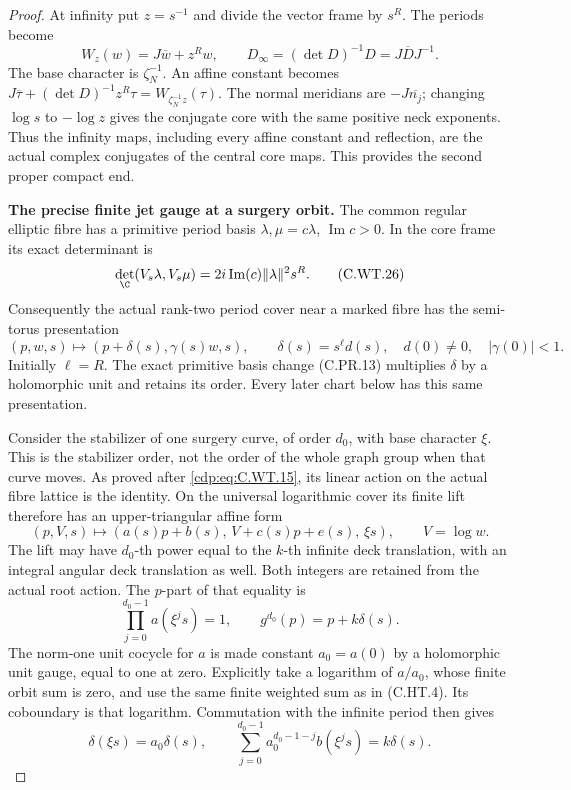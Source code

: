 \begin{proof}
At infinity put \(z=s^{-1}\)
and divide the vector frame
by \(s^R\). The periods become
\[
              W_z(w)=J\overline w+z^Rw,\qquad
              D_{\infty}=(\det D)^{-1}D
                       =J\overline D J^{-1}.
 \tag{C.WT.25}\label{cdp:eq:C.WT.25}
\]
The base character is
\(\zeta_N^{-1}\). An affine
constant becomes
\(J\overline\tau+(\det D)^{-1}z^R\tau
=W_{\zeta_N^{-1}z}(\tau)\).
The normal meridians are
\(-J\overline{n_j}\); changing
\(\log s\) to \(-\log z\)
gives the conjugate core
with the same positive neck
exponents. Thus the infinity
maps, including every affine
constant and reflection, are
the actual complex conjugates
of the central core maps.
This provides the second
proper compact end.

\par\medskip\noindent\textbf{The precise finite jet gauge at a surgery orbit.}
The common regular elliptic fibre has a
primitive period basis \(\lambda,\mu=c\lambda\),
\(\operatorname{Im}c>0\). In the core frame
its exact determinant is
\[
 \det_{\C}(V_s\lambda,V_s\mu)
              =2i\operatorname{Im}(c)\|\lambda\|^2s^R .
 \tag{C.WT.26}\label{cdp:eq:C.WT.26}
\]
Consequently the actual rank-two period
cover near a marked fibre has the
semi-torus presentation
\[
 (p,w,s)\longmapsto(p+\delta(s),\gamma(s)w,s),
 \qquad \delta(s)=s^{\ell} d(s),\quad d(0)\ne0,
                     \quad|\gamma(0)|<1 .
 \tag{C.WT.27}\label{cdp:eq:C.WT.27}
\]
Initially \(\ell=R\). The exact primitive
basis change (C.PR.13) multiplies \(\delta\)
by a holomorphic unit and retains its
order. Every later chart below has this
same presentation.

Consider the stabilizer of one surgery
curve, of order \(d_0\), with base
character \(\xi\). This is the stabilizer
order, not the order of the whole
graph group when that curve moves.
As proved after \eqref{cdp:eq:C.WT.15}, its linear
action on the actual fibre lattice
is the identity. On the universal
logarithmic cover its finite lift
therefore has an upper-triangular
affine form
\[
 (p,V,s)\longmapsto
    (a(s)p+b(s),\,V+c(s)p+e(s),\,\xi s),
                     \qquad V=\log w .
 \tag{C.WT.28}\label{cdp:eq:C.WT.28}
\]
The lift may have \(d_0\)-th power
equal to the \(k\)-th infinite deck
translation, with an integral
angular deck translation as well.
Both integers are retained from the
actual root action. The \(p\)-part
of that equality is
\[
 \prod_{j=0}^{d_0-1}a(\xi^j s)=1,\qquad
                 g^{d_0}(p)=p+k\delta(s).
 \tag{C.WT.29}\label{cdp:eq:C.WT.29}
\]
The norm-one unit cocycle for \(a\)
is made constant \(a_0=a(0)\) by
a holomorphic unit gauge, equal
to one at zero. Explicitly take
a logarithm of \(a/a_0\), whose
finite orbit sum is zero, and
use the same finite weighted
sum as in (C.HT.4). Its
coboundary is that logarithm.
Commutation with the infinite
period then gives
\[
 \delta(\xi s)=a_0\delta(s),\qquad
 \sum_{j=0}^{d_0-1}a_0^{d_0-1-j}b(\xi^j s)
                                      =k\delta(s).
 \tag{C.WT.30}\label{cdp:eq:C.WT.30}
\]


\end{proof}
